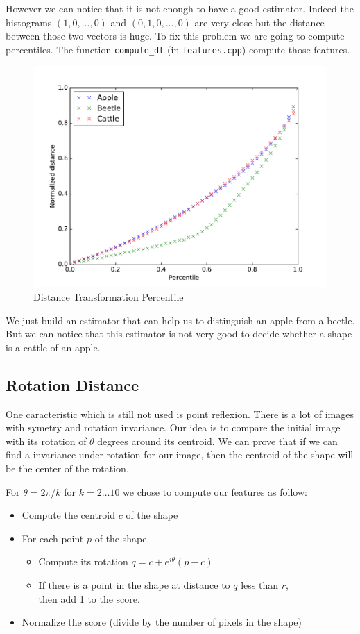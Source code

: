 \documentclass[a4paper, 11pt]{article}
\begin{document}
However we can notice that it is not enough to have a good estimator. Indeed the histograms $(1, 0, \dots, 0)$ and $(0, 1, 0, \dots, 0)$ are very close but the distance between those two vectors is huge. To fix this problem we are going to compute percentiles. The function \verb|compute_dt| (in \verb|features.cpp|) compute those features.
\begin{figure}[h!]
\centering
\includegraphics[width=13cm]{percentiles.pdf}
\caption{Distance Transformation Percentile}
\end{figure}

We just build an estimator that can help us to distinguish an apple from a beetle. But we can notice that this estimator is not very good to decide whether a shape is a cattle of an apple.

\newpage
\subsection{Rotation Distance}

One caracteristic which is still not used is point reflexion. There is a lot of images with symetry and rotation invariance. Our idea is to compare the initial image with its rotation of $\theta$ degrees around its centroid. We can prove that if we can find a invariance under rotation for our image, then the centroid of the shape will be the center of the rotation.

\medskip \noindent For $\theta = 2 \pi / k$ for $k = 2 \dots 10$ we chose to compute our features as follow:
\begin{itemize}
  \item Compute the centroid $c$ of the shape
	\item For each point $p$ of the shape
	\begin{itemize}
	\item Compute its rotation $q = c + e^{i\theta}(p - c)$
	\item If there is a point in the shape at distance to $q$ less than $r$,\\then add 1 to the score.
  \end{itemize}
  \item Normalize the score (divide by the number of pixels in the shape)
\end{itemize}
\end{document}
